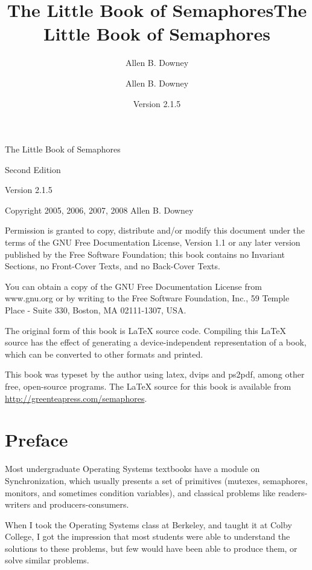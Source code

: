 \documentclass{book}
\title{The Little Book of Semaphores}
\author{Allen B. Downey}
\newcommand{\theversion}{Version 2.1.5}
\begin{document}
\title {The Little Book of Semaphores}
\author {Allen B. Downey}

\date {\theversion}
\maketitle

\vspace{2in}
\begin{center}
{\Large The Little Book of Semaphores}

Second Edition
\vspace{0.25in}

\theversion
\vspace{0.25in}

Copyright 2005, 2006, 2007, 2008 Allen B. Downey
\end{center}
\vspace{0.25in}

Permission is granted to copy, distribute and/or modify this
document under the terms of the GNU Free Documentation License,
Version 1.1  or any later version published by the Free Software
Foundation; this book contains no Invariant Sections,
no Front-Cover Texts, and no Back-Cover Texts.

You can obtain a copy of the GNU Free Documentation License
from www.gnu.org or by writing to the Free Software Foundation,
Inc., 59 Temple Place - Suite 330, Boston, MA 02111-1307, USA.

The original form of this book is LaTeX source code.
Compiling this LaTeX source has the effect of generating
a device-independent representation of a book, which
can be converted to other formats and printed.

This book was typeset by the author using latex, dvips and ps2pdf,
among other free, open-source programs.
The LaTeX source for this book is available from
\url{http://greenteapress.com/semaphores}.

\frontmatter

\chapter{Preface}

Most undergraduate Operating Systems textbooks have a module on
Synchronization, which usually presents a set of primitives
(mutexes, semaphores, monitors, and sometimes condition variables),
and classical problems like readers-writers and
producers-consumers.

When I took the Operating Systems class at Berkeley, and taught it at
Colby College, I got the impression that most students were able to
understand the solutions to these problems, but few would have been
able to produce them, or solve similar problems.
\end{document}
